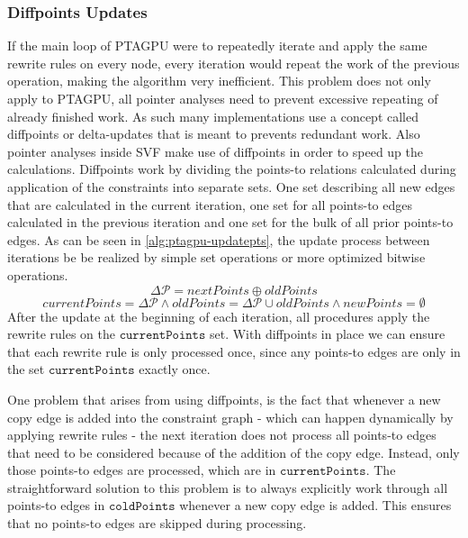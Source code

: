 \subsubsection{Diffpoints Updates}\label{sec:diffpts}
If the main loop of PTAGPU were to repeatedly iterate and apply the same rewrite rules on every node, every iteration would repeat the work of the previous operation, making the algorithm very inefficient.
This problem does not only apply to PTAGPU, all pointer analyses need to prevent excessive repeating of already finished work.
As such many implementations use a concept called diffpoints or delta-updates that is meant to prevents redundant work. Also pointer analyses inside SVF make use of diffpoints in order to speed up the calculations.
Diffpoints work by dividing the points-to relations calculated during application of the constraints into separate sets.
One set describing all new edges that are calculated in the current iteration, one set for all points-to edges calculated in the previous iteration and one set for the bulk of all prior points-to edges.
As can be seen in \autoref{alg:ptagpu-updatepts}, the update process between iterations be be realized by simple set operations or more optimized bitwise operations.
$$\Delta \mathcal{P} = nextPoints\oplus oldPoints$$
$$currentPoints = \Delta \mathcal{P}\wedge oldPoints = \Delta \mathcal{P} \cup oldPoints\wedge newPoints = \emptyset$$
After the update at the beginning of each iteration, all procedures apply the rewrite rules on the $\mathtt{currentPoints}$ set.
With diffpoints in place we can ensure that each rewrite rule is only processed once, since any points-to edges are only in the set $\mathtt{currentPoints}$ exactly once.

One problem that arises from using diffpoints, is the fact that whenever a new copy edge is added into the constraint graph - which can happen dynamically by applying rewrite rules - the next iteration does not process all points-to edges that need to be considered because of the addition of the copy edge. Instead, only those points-to edges are processed, which are in $\mathtt{currentPoints}$. The straightforward solution to this problem is to always explicitly work through all points-to edges in $\mathtt{coldPoints}$ whenever a new copy edge is added.
This ensures that no points-to edges are skipped during processing.
